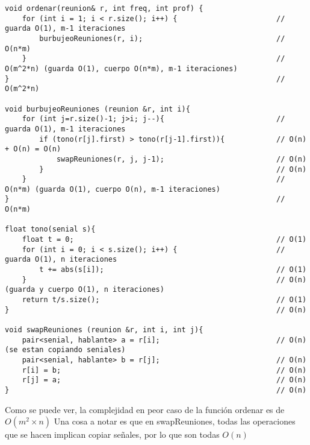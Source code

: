 \documentclass{article}
\begin{document}
\begin{lstlisting}
void ordenar(reunion& r, int freq, int prof) {
    for (int i = 1; i < r.size(); i++) {                       // guarda O(1), m-1 iteraciones
        burbujeoReuniones(r, i);                               // O(n*m)
    }                                                          // O(m^2*n) (guarda O(1), cuerpo O(n*m), m-1 iteraciones)
}                                                              // O(m^2*n)

void burbujeoReuniones (reunion &r, int i){
    for (int j=r.size()-1; j>i; j--){                          // guarda O(1), m-1 iteraciones
        if (tono(r[j].first) > tono(r[j-1].first)){            // O(n) + O(n) = O(n)
            swapReuniones(r, j, j-1);                          // O(n)
        }                                                      // O(n)
    }                                                          // O(n*m) (guarda O(1), cuerpo O(n), m-1 iteraciones)
}                                                              // O(n*m)

float tono(senial s){
    float t = 0;                                               // O(1)
    for (int i = 0; i < s.size(); i++) {                       // guarda O(1), n iteraciones
        t += abs(s[i]);                                        // O(1)
    }                                                          // O(n) (guarda y cuerpo O(1), n iteraciones)
    return t/s.size();                                         // O(1)
}                                                              // O(n)

void swapReuniones (reunion &r, int i, int j){
    pair<senial, hablante> a = r[i];                           // O(n) (se estan copiando seniales)
    pair<senial, hablante> b = r[j];                           // O(n)
    r[i] = b;                                                  // O(n)
    r[j] = a;                                                  // O(n)
}                                                              // O(n)
\end{lstlisting}

Como se puede ver, la complejidad en peor caso de la función ordenar es de $O(m^2\times n)$
Una cosa a notar es que en swapReuniones, todas las operaciones que se hacen implican copiar señales,
por lo que son todas $O(n)$


\newpage
\end{document}
